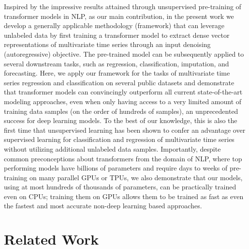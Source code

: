 \documentclass{article} \usepackage{iclr2021_conference,times}
\begin{document}
Inspired by the impressive results attained through unsupervised pre-training of transformer models in NLP, as our main contribution, in the present work we develop a generally applicable methodology (framework) that can leverage unlabeled data by first training a transformer model to extract dense vector representations of multivariate time series through an input denoising (autoregressive) objective. The pre-trained model can be subsequently applied to several downstream tasks, such as regression, classification, imputation, and forecasting. Here, we apply our framework for the tasks of multivariate time series regression and classification on several public datasets and demonstrate that transformer models can convincingly outperform all current state-of-the-art modeling approaches, even when only having access to a very limited amount of training data samples (on the order of hundreds of samples), an unprecedented success for deep learning models. To the best of our knowledge, this is also the first time that unsupervised learning has been shown to confer an advantage over supervised learning for classification and regression of multivariate time series without utilizing additional unlabeled data samples. Importantly, despite common preconceptions about transformers from the domain of NLP, where top performing models have billions of parameters and require days to weeks of pre-training on many parallel GPUs or TPUs, we also demonstrate that our models, using at most hundreds of thousands of parameters, can be practically trained even on CPUs; training them on GPUs allows them to be trained as fast as even the fastest and most accurate non-deep learning based approaches.



\section{Related Work}
\end{document}
